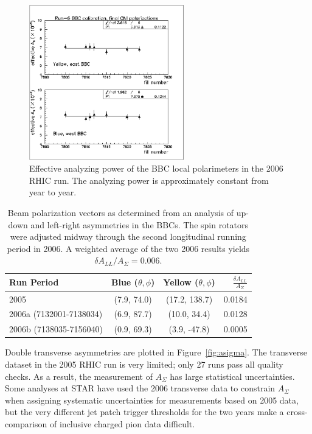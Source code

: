 \begin{figure}
  \centering
  \includegraphics[width=0.6\textwidth]{figures/bbc-analyzing-power}
  \caption{Effective analyzing power of the BBC local polarimeters in the 2006 RHIC run.  The analyzing power is approximately constant from year to year.}
  \label{fig:bbc-analyzing-power}
\end{figure}

\begin{table}
  \begin{center}
    \begin{tabular}{|l|c|c|r|}
      \hline
      Run Period & Blue ($\theta, \phi$) & Yellow ($\theta, \phi$) &
      $\frac{\delta A_{LL}}{A_{\Sigma}}$\\
      \hline
      2005 & (7.9, 74.0) & (17.2, 138.7) & 0.0184 \\
      2006a (7132001-7138034) & (6.9, 87.7) & (10.0, 34.4) & 0.0128 \\
      2006b (7138035-7156040) & (0.9, 69.3) & (3.9, -47.8) & 0.0005 \\
      \hline
    \end{tabular}
  \end{center}
  \caption{Beam polarization vectors as determined from an analysis of up-down and left-right asymmetries in the BBCs.  The spin rotators were adjusted midway through the second longitudinal running period in 2006.  A weighted average of the two 2006 results yields $\delta A_{LL} / A_{\Sigma} = 0.006$.}
  \label{tab:pol-vectors}
\end{table}

Double transverse asymmetries are plotted in Figure~\ref{fig:asigma}.  The transverse dataset in the 2005 RHIC run is very limited; only 27 runs pass all quality checks.  As a result, the measurement of \(A_{\Sigma}\) has large statistical uncertainties.  Some analyses at STAR have used the 2006 transverse data to constrain \(A_{\Sigma}\) when assigning systematic uncertainties for measurements based on 2005 data, but the very different jet patch trigger thresholds for the two years make a cross-comparison of inclusive charged pion data difficult.

